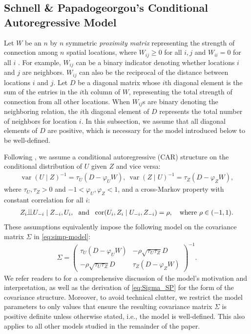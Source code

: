 \documentclass[11pt]{article}
\theoremstyle{definition}
\theoremstyle{remark}
\DeclareMathOperator{\var}{var}
\DeclareMathOperator{\cor}{cor}
\def\ind{\begin{picture}(9,8)
    \put(0,0){\line(1,0){9}}
    \put(3,0){\line(0,1){8}}
    \put(6,0){\line(0,1){8}}
    \end{picture}
   }
\begin{document}
\subsection{Schnell \& Papadogeorgou's Conditional Autoregressive Model}
\label{sec:car-papadogeorgu}

Let $W$ be an $n$ by $n$ symmetric \emph{proximity matrix} representing the 
strength
of connection among $n$ spatial locations, where $W_{ij} \ge 0$ for all $i,j$ and  $W_{ii}=0$ for all $i$ \citep{banerjee2003hierarchical}.  
For example, $W_{ij}$ can be a binary indicator denoting whether locations $i$ and $j$ are neighbors. $W_{ij}$ can also be the reciprocal of the distance between locations $i$ and $j$. 
Let $D$ be a diagonal matrix whose $i$th diagonal element is the sum of the entries in the $i$th column of $W$, representing the total strength of connection from all other locations. 
When $W_{ij}$s are binary denoting the neighboring relation, the $i$th diagonal element of $D$ represents the total number of neighbors for location $i$. 
In this subsection, we assume that all diagonal elements of $D$ are positive, which is necessary for the model introduced below to be well-defined. 

Following \citet{schnell2020mitigating}, we assume a conditional autoregressive (CAR) structure \citep{gelfand2010handbook} on the conditional distribution of $U$ given $Z$ and vice versa: 
\begin{align*}
    \var(U\mid Z)^{-1} = \tau_U(D-\varphi_U W), \  
    \var(Z \mid U)^{-1} = \tau_Z(D-\varphi_Z W), 
\end{align*}
where $\tau_U, \tau_Z > 0$ and $-1 < \varphi_U, \varphi_Z < 1$,
and a cross-Markov property with constant correlation for all $i$:
\begin{align*}
    Z_i \ind U_{-i} \mid Z_{-i}, U_i, \ \ 
    \text{and}  \ \ 
    \cor(U_i, Z_i\mid U_{-i}, Z_{-i}) = \rho, 
    \quad \text{where }  \rho \in (-1,1).  
\end{align*}
These assumptions equivalently impose the following model on the covariance matrix $\Sigma$ in \eqref{eq:simp-model}:
\begin{align}\label{eq:Sigma_SP}
    \Sigma = 
    \begin{pmatrix} 
        \tau_U(D-\varphi_U W) & -\rho\sqrt{\tau_U\tau_Z} D \\
        -\rho\sqrt{\tau_U\tau_Z} D & \tau_Z(D-\varphi_Z W)
    \end{pmatrix}^{-1}.
\end{align}
We refer readers to \citet{schnell2020mitigating} for a comprehensive discussion of the model’s motivation and interpretation, as well as the derivation of \eqref{eq:Sigma_SP} for the form of the covariance structure.
Moreover, to avoid technical clutter, we restrict the model parameters to only values that ensure the resulting covariance matrix $\Sigma$ is positive definite unless otherwise stated, i.e., the model is well-defined. This also applies to all other models studied in the remainder of the paper.
\end{document}
